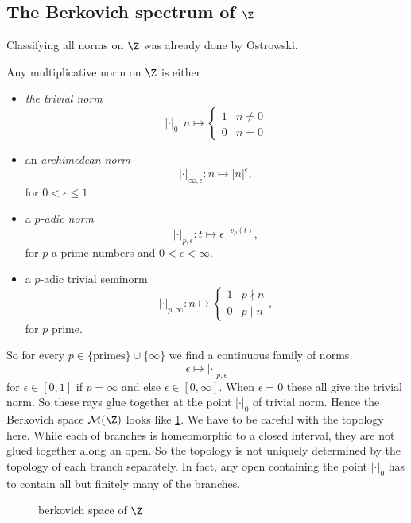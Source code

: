 \subsection{The Berkovich spectrum of $\Z$} \label{sec:the_berkovich_spectrum_of_z}
Classifying all norms on $\Z$ was already done by Ostrowski.
\begin{theorem}[Ostrowski]\label{thm:ostrowksi}
	Any multiplicative norm on $\Z$ is either
	\begin{itemize}
		\item \emph{the trivial norm} \[
				|\cdot |_0: n \mapsto \begin{cases}
					1 & n \ne 0 \\
					0 & n = 0
				\end{cases}
			\]
		\item an \emph{archimedean norm} \[
				|\cdot |_{\infty, \epsilon}: n \mapsto |n|^{\epsilon},
			\]
			for $0 <  \epsilon \le 1$
		\item a \emph{$p$-adic norm} \[
				|\cdot |_{p, \epsilon}: t \mapsto \epsilon ^{- v_p(t)},
			\]
			for $p$ a prime numbers and $0 < \epsilon < \infty$. 
		\item a $p$-adic trivial seminorm 
			\[
			|\cdot |_{p, \infty}: n \mapsto \begin{cases}
				1 & p \nmid n \\
				0 & p \mid n
			\end{cases}
			,\] 
			for $p$ prime. 
	\end{itemize}
\end{theorem}
So for every $p \in \{\text{primes}\} \cup \{\infty\} $ we find a continuous family of norms \[
	\epsilon \mapsto|\cdot |_{p, \epsilon}
\] 
for $\epsilon \in [0, 1]$ if $p = \infty$ and else $\epsilon \in [0, \infty]$. 
When $\epsilon = 0$ these all give the trivial norm. 
So these rays glue together at the point $|\cdot |_0$ of trivial norm.
Hence the Berkovich space $\mathcal{M} (\Z)$ looks like \cref{fig:berkovich-space-of-z}.
We have to be careful with the topology here.
While each of branches is homeomorphic to a closed interval, they are not glued together along an open.
So the topology is not uniquely determined by the topology of each branch separately.
In fact, any open containing the point $|\cdot |_0$ has to contain all but finitely many of the branches.

\begin{figure}[h]
    \centering
    \caption{berkovich space of $\Z$}
    \label{fig:berkovich-space-of-z}
\end{figure}


